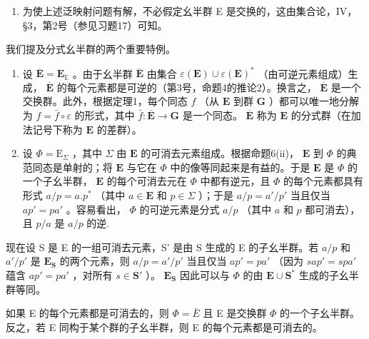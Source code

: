 \begin{enumerate}
\def\labelenumi{(\arabic{enumi})}
\setcounter{enumi}{1}
\tightlist
\item
  为使上述泛映射问题有解，不必假定幺半群 E 是交换的，这由集合论，IV，§3，第2号（参见习题17）可知。
\end{enumerate}

我们提及分式幺半群的两个重要特例。

\begin{enumerate}
\def\labelenumi{(\alph{enumi})}
\item
  设 \(\overline{\mathbf{E}} = \mathbf{E}_{\mathbb{E}}\) 。由于幺半群 \(\overline{\mathbf{E}}\) 由集合 \(\varepsilon(\mathbf{E}) \cup \varepsilon(\mathbf{E})^*\) （由可逆元素组成）生成， \(\overline{\mathbf{E}}\) 的每个元素都是可逆的（第3号，命题4的推论2）。换言之， \(\overline{\mathbf{E}}\) 是一个交换群。此外，根据定理1，每个同态 \(f\) （从 \(\mathbf{E}\) 到群 \(\mathbf{G}\) ）都可以唯一地分解为 \(f = \bar{f} \circ \varepsilon\) 的形式，其中 \(\bar{f}: \overline{\mathbf{E}} \to \mathbf{G}\) 是一个同态。 \(\overline{\mathbf{E}}\) 称为 \(\mathbf{E}\) 的分式群（在加法记号下称为 \(\mathbf{E}\) 的差群）。
\item
  设 \(\Phi = \mathrm{E}_{\Sigma}\) ，其中 \(\Sigma\) 由 \(\mathbf{E}\) 的可消去元素组成。根据命题6(ii)， \(\mathbf{E}\) 到 \(\Phi\) 的典范同态是单射的；将 \(\mathbf{E}\) 与它在 \(\Phi\) 中的像等同起来是有益的。于是 \(\mathbf{E}\) 是 \(\Phi\) 的一个子幺半群， \(\mathbf{E}\) 的每个可消去元在 \(\Phi\) 中都有逆元，且 \(\Phi\) 的每个元素都具有形式 \(a/p = a.p^{*}\) （其中 \(a \in \mathbf{E}\) 和 \(p \in \Sigma\) ）；于是 \(a/p = a'/p'\) 当且仅当 \(ap' = pa'\) 。容易看出， \(\Phi\) 的可逆元素是分式 \(a/p\) （其中 \(a\) 和 \(p\) 都可消去），且 \(p/a\) 是 \(a/p\) 的逆.
\end{enumerate}

现在设 S 是 E 的一组可消去元素，S' 是由 S 生成的 E 的子幺半群。若 \(a/p\) 和 \(a'/p'\) 是 \(\mathbf{E}_{\mathbf{S}}\) 的两个元素，则 \(a/p = a'/p'\) 当且仅当 \(ap' = pa'\) （因为 \(sap' = spa'\) 蕴含 \(ap' = pa'\) ，对所有 \(s \in \mathbf{S}'\) ）。 \(\mathbf{E}_{\mathbf{S}}\) 因此可以与 \(\Phi\) 的由 \(\mathbf{E} \cup \mathbf{S}^*\) 生成的子幺半群等同。

如果 E 的每个元素都是可消去的，则 \(\Phi = \bar{E}\) 且 E 是交换群 \(\Phi\) 的一个子幺半群。反之，若 E 同构于某个群的子幺半群，则 E 的每个元素都是可消去的。

